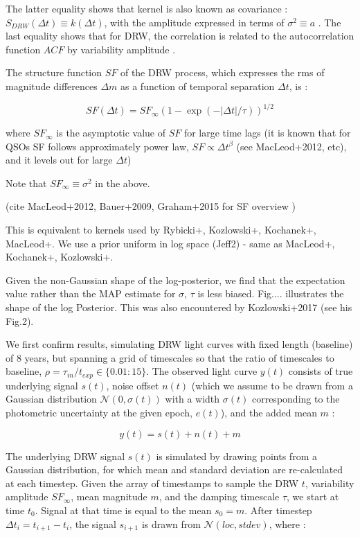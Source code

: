 \documentclass[twocolumn]{aastex62}
\begin{document}
The latter equality shows that kernel is also known as covariance : $S_{DRW}(\Delta t) \equiv k(\Delta t)$, with  the amplitude expressed in terms of $\sigma^{2} \equiv a $ . The last equality shows that for DRW, the correlation is related to the autocorrelation function $ACF$ by variability amplitude . 

The structure function $SF$ of the DRW process, which expresses the rms of  magnitude differences $\Delta m$ as a function of 
temporal separation $\Delta t$, is : 

\begin{equation}
SF(\Delta t) = SF_{\infty} (1-\exp{(-|\Delta t|/\tau)})^{1/2}
\end{equation}

where $SF_{\infty}$ is the asymptotic value of $SF$ for large time lags (it is known that for QSOs SF follows approximately power law, $SF \propto \Delta t^{\beta}$ (see MacLeod+2012,  etc), and it levels out for large $\Delta t$)

Note that $SF_\infty \equiv \sigma^{2}$  in the above. 

(cite MacLeod+2012,  Bauer+2009, Graham+2015 for SF overview )

This is equivalent to kernels used by Rybicki+, Kozlowski+, Kochanek+, MacLeod+. We use a prior uniform in log space  (Jeff2) - same as MacLeod+, Kochanek+, Kozlowski+. 

Given the non-Gaussian shape of the log-posterior, we find that the expectation value rather than the MAP estimate for $\sigma$, $\tau$ is less biased.   Fig.... illustrates the shape of the log Posterior.  This was also encountered by Kozlowski+2017 (see his  Fig.2). 

We first confirm \cite{kozlowski2017a} results, simulating DRW light curves with fixed length (baseline) of 8 years, but spanning a grid  of timescales so that the ratio of timescales to baseline,  $\rho = \tau_{in} / t_{exp} \in   \{ 0.01 : 15\}$.  The observed light curve $y(t)$ consists of  true underlying signal  $s(t)$,  noise offset $n(t)$ (which we assume to be drawn from a Gaussian distribution $\mathcal{N}(0,\sigma(t))$ with a width $\sigma(t)$ corresponding to the  photometric uncertainty at the given epoch,  $e(t)$), and the added mean $m$ : 

\begin{equation}
y(t) = s(t) + n(t) + m
\end{equation}

The underlying DRW signal  $s(t)$  is simulated by drawing  points from a Gaussian distribution, for which mean and standard deviation are re-calculated at each timestep. Given the array of timestamps to sample the DRW $t$,  variability amplitude $SF_{\infty}$, mean magnitude  $m$, and the damping timescale $\tau$, we start at time $t_{0}$. Signal at that time is equal to the mean $s_{0} = m$. After timestep $\Delta t_{i} = t_{i+1} - t_{i}$, the signal $s_{i+1}$ is drawn from  $\mathcal{N}(loc, stdev)$, where : 
\end{document}
